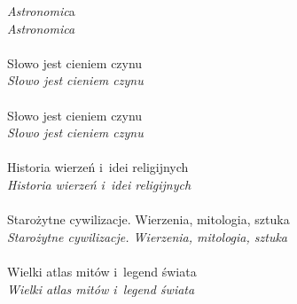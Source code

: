 \documentclass[a4paper,11pt]{article}
\begin{document}
\Jest  \emph{Astronomic}a \\
\Powin \emph{Astronomica} \\
 \\
\Jest  Słowo jest cieniem czynu \\
\Powin \emph{Słowo jest cieniem czynu} \\
 \\
\Jest  Słowo jest cieniem czynu \\
\Powin \emph{Słowo jest cieniem czynu} \\
 \\
\Jest  Historia wierzeń i~idei religijnych \\
\Powin \emph{Historia wierzeń i~idei religijnych} \\
 \\
\Jest  Starożytne cywilizacje. Wierzenia, mitologia, sztuka \\
\Powin \emph{Starożytne cywilizacje. Wierzenia, mitologia, sztuka} \\
 \\
\Jest  Wielki atlas mitów i~legend świata \\
\Powin \emph{Wielki atlas mitów i~legend świata} \\


\vspace{\spaceTwo}










 {}



\end{document}
